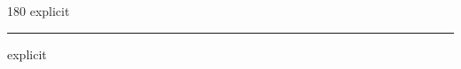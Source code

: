 
\begin{frame}
\begin{center}
\begin{turn}{180}
{\fontsize{2.5cm}{1em}\selectfont explicit}
\end{turn}
\vspace{1em}\par  
\hrule
\vspace{1em}\par  
{\fontsize{2.5cm}{1em}\selectfont explicit}
\end{center}
\end{frame}

